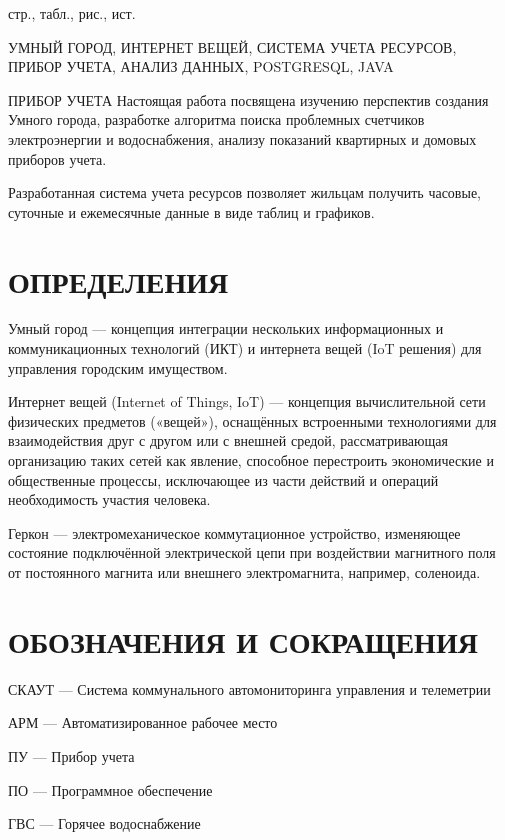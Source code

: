 \documentclass[a4paper,12pt]{article}
\newcounter{mycitecount}                                %
\begin{document}
 стр.,  табл.,  рис., \totalmycitecounts ист. 

УМНЫЙ ГОРОД, ИНТЕРНЕТ ВЕЩЕЙ, СИСТЕМА УЧЕТА РЕСУРСОВ, ПРИБОР УЧЕТА, АНАЛИЗ ДАННЫХ, POSTGRESQL, JAVA

ПРИБОР УЧЕТА
Настоящая работа посвящена изучению перспектив создания Умного города, разработке алгоритма поиска проблемных счетчиков электроэнергии и водоснабжения, анализу показаний квартирных и домовых приборов учета.

Разработанная система учета ресурсов позволяет жильцам получить часовые, суточные и ежемесячные данные в виде таблиц и графиков.

\pagebreak
\thispagestyle{empty}

\section*{\centering ОПРЕДЕЛЕНИЯ}

Умный город --- концепция интеграции нескольких информационных и коммуникационных технологий (ИКТ) и интернета вещей (IoT решения) для управления городским имуществом.

Интернет вещей (Internet of Things, IoT) --- концепция вычислительной сети физических предметов («вещей»), оснащённых встроенными технологиями для взаимодействия друг с другом или с внешней средой, рассматривающая организацию таких сетей как явление, способное перестроить экономические и общественные процессы, исключающее из части действий и операций необходимость участия человека. 

Геркон --- электромеханическое коммутационное устройство, изменяющее состояние подключённой электрической цепи при воздействии магнитного поля от постоянного магнита или внешнего электромагнита, например, соленоида.

\pagebreak

\section*{\centering ОБОЗНАЧЕНИЯ И СОКРАЩЕНИЯ}


СКАУТ --- Система коммунального автомониторинга управления и телеметрии

АРМ --- Автоматизированное рабочее место

ПУ --- Прибор учета

ПО --- Программное обеспечение

ГВС --- Горячее водоснабжение
\end{document}
